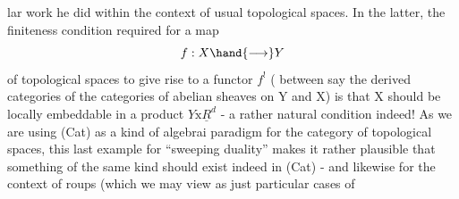 lar work he did within the context of usual topological spaces.  In the
latter,  the finiteness condition required for a map 
\[ f: X \hand{\longrightarrow} Y \]
of topological spaces to give rise to a functor  $f^{!}$  ( between\hand{,} say\hand{,}
the derived categories of the categories of abelian sheaves on Y and X)
is  that X should be locally embeddable in a product  $Y\mathrm{x}\underline{R}^{d}$  -  a rather
natural condition indeed!   As we are using (Cat) as a kind of algebrai
paradigm for the category of topological spaces,  this last example
for ``sweeping duality''  makes it rather plausible  that something
of the same kind should exist indeed in (Cat)  -  and likewise for the
context of roups  (which we may view as just particular cases of


